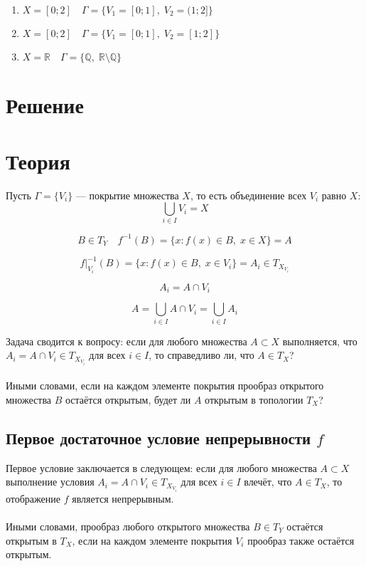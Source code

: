 \documentclass{article}
\begin{document}
        \begin{enumerate}
            \item \( X = [0; 2] \quad \Gamma = \{ V_1 = [0; 1], \; V_2 = (1; 2] \} \)
            \item \( X = [0; 2] \quad \Gamma = \{ V_1 = [0; 1], \; V_2 = [1; 2] \} \)
            \item \( X = \mathbb{R} \quad \Gamma = \{ \mathbb{Q}, \; \mathbb{R} \setminus \mathbb{Q} \} \)
        \end{enumerate}

        \section*{Решение}
        \section*{Теория}

        Пусть \( \Gamma = \{ V_i \} \) — покрытие множества \( X \), то есть объединение всех \( V_i \) равно \( X \): 
        \[
        \bigcup_{i \in I} V_i = X
        \]
            

        \[
        B \in T_Y \quad f^{-1}(B) = \{ x : f(x) \in B, \; x \in X \} = A
        \]
        
        \[
        f|_{V_i}^{-1}(B) = \{ x : f(x) \in B, \; x \in V_i \} = A_i \in T_{X_{V_i}}
        \]
        
        \[
        A_i = A \cap V_i
        \]
        
        \[
        A = \bigcup_{i \in I} A \cap V_i = \bigcup_{i \in I} A_i
        \]

        Задача сводится к вопросу: если для любого множества \( A \subset X \) выполняется, что \( A_i = A \cap V_i \in T_{X_{V_i}} \) для всех \( i \in I \), то справедливо ли, что \( A \in T_X \)?\\ \\ Иными словами, если на каждом элементе покрытия прообраз открытого множества \( B \) остаётся открытым, будет ли \( A \) открытым в топологии \( T_X \)?
        
        \subsection*{Первое достаточное условие непрерывности \( f \)}
        
        Первое условие заключается в следующем: если для любого множества \( A \subset X \) выполнение условия \( A_i = A \cap V_i \in T_{X_{V_i}} \) для всех \( i \in I \) влечёт, что \( A \in T_X \), то отображение \( f \) является непрерывным.\\ \\ Иными словами, прообраз любого открытого множества \( B \in T_Y \) остаётся открытым в \( T_X \), если на каждом элементе покрытия \( V_i \) прообраз также остаётся открытым.
        
\end{document}
